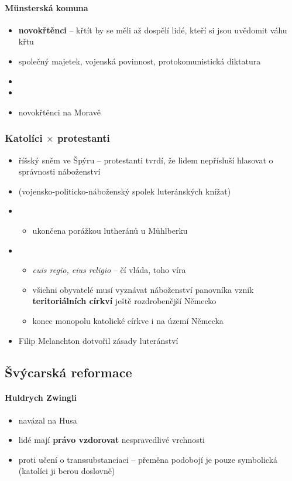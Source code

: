 \paragraph{Münsterská komuna}
\begin{itemize}
\item \textbf{novokřtěnci} -- křtít by se měli až dospělí lidé, kteří si jsou uvědomit váhu křtu
\item společný majetek, vojenská povinnost, protokomunistická diktatura 
\item {}
\item {}
\item novokřtěnci na Moravě
\end{itemize}

\subsubsection{Katolíci $\times$ protestanti}
\begin{itemize}
\item říšský sněm ve Špýru -- protestanti tvrdí, že lidem nepřísluší hlasovat o správnosti náboženství
\item {} (vojensko-politicko-náboženský spolek luteránských knížat)
\item {}
	\begin{itemize}
	\item ukončena porážkou lutheránů u Mühlberku 
	\end{itemize}
\item {}
	\begin{itemize}
	\item \textit{cuis regio, eius religio} -- čí vláda, toho víra
	\item všichni obyvatelé musí vyznávat náboženství panovníka \ra vznik \textbf{teritoriálních církví} \ra ještě rozdrobenější Německo
	\item[\ra] konec monopolu katolické církve i na území Německa
	\end{itemize}
\item Filip Melanchton dotvořil zásady luteránství
\end{itemize}

\subsection{Švýcarská reformace}
\paragraph{Huldrych Zwingli}
\begin{itemize}
\item navázal na Husa
\item lidé mají \textbf{právo vzdorovat} nespravedlivé vrchnosti
\item proti učení o transsubstanciaci -- přeměna podobojí je pouze symbolická (katolíci ji berou doslovně)
\end{itemize}

